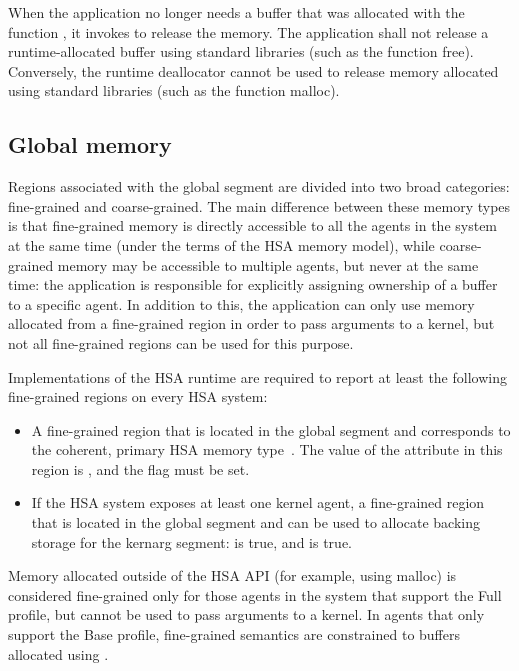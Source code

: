 \documentclass[final,oneside]{book}
\begin{document}
When the application no longer needs a buffer that was allocated with the
function , it invokes  to
release the memory. The application shall not release a runtime-allocated buffer
using standard libraries (such as the function free). Conversely, the runtime
deallocator cannot be used to release memory allocated using standard libraries
(such as the function malloc).

\subsection{Global memory}\label{sec:memory:global}

Regions associated with the global segment are divided into two broad
categories: fine-grained and coarse-grained. The main difference between these
memory types is that fine-grained memory is directly accessible to all the
agents in the system at the same time (under the terms of the HSA memory model),
while coarse-grained memory may be accessible to multiple agents, but never at
the same time: the application is responsible for explicitly assigning ownership
of a buffer to a specific agent. In addition to this, the application can only
use memory allocated from a fine-grained region in order to pass arguments to a
kernel, but not all fine-grained regions can be used for this purpose.

Implementations of the HSA runtime are required to report at least the following
fine-grained regions on every HSA system:
\begin{itemize}[itemsep=1pt,topsep=3pt,partopsep=0pt]
\item A fine-grained region that is located in the global segment and
  corresponds to the coherent, primary HSA memory type~\cite{sar}. The value of
  the attribute  in this region is
  , and the
   flag must be set.
\item If the HSA system exposes at least one kernel agent, a fine-grained
  region that is located in the global segment and can be used to allocate
  backing storage for the kernarg segment:
   is true, and
   is true.
\end{itemize}

Memory allocated outside of the HSA API (for example, using malloc) is
considered fine-grained only for those agents in the system that support the
Full profile, but cannot be used to pass arguments to a kernel. In agents
that only support the Base profile, fine-grained semantics are constrained to
buffers allocated using .
\end{document}
